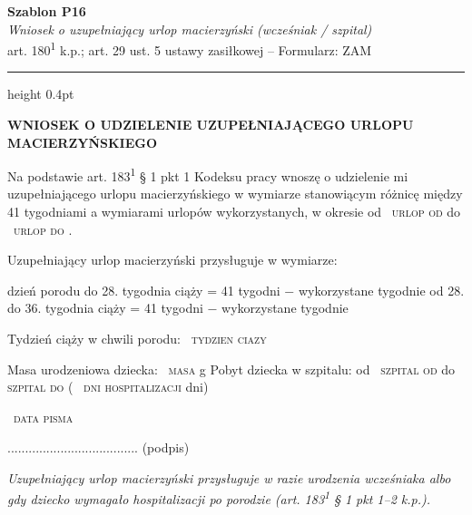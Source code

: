 \documentclass[11pt,a4paper]{article}
\newcommand{\Pole}[1]{%
  \textcolor{szary}{\dotfill}\,%
  {\scriptsize\textcolor{szary}{\textsc{#1}}}%
}
\newcommand{\NaglowekPisma}[1]{%
  \par\vspace{0.8em}%
  \begin{center}%
    {\large\bfseries\MakeUppercase{#1}}%
  \end{center}%
  \vspace{0.4em}%
}
\begin{document}
\begin{flushright}
{\footnotesize\color{szary}
\textbf{Szablon P16}\\
{\itshape Wniosek o uzupełniający urlop macierzyński (wcześniak / szpital)}\\
art. 180\textsuperscript{1} k.p.; art. 29 ust. 5 ustawy zasiłkowej -- Formularz: ZAM}\
\end{flushright}

\vspace{0.5em}
{\color{ramka}\hrule height 0.4pt}
\vspace{0.8em}

\NaglowekPisma{WNIOSEK O UDZIELENIE UZUPEŁNIAJĄCEGO URLOPU MACIERZYŃSKIEGO}

Na podstawie art. 183\textsuperscript{1} \S{} 1 pkt 1 Kodeksu pracy wnoszę o udzielenie mi
uzupełniającego urlopu macierzyńskiego w wymiarze stanowiącym różnicę
między 41 tygodniami a wymiarami urlopów wykorzystanych, w okresie
od \Pole{urlop od} do \Pole{urlop do}.

Uzupełniający urlop macierzyński przysługuje w wymiarze:

dzień porodu do 28. tygodnia ciąży        = 41 tygodni − wykorzystane tygodnie
od 28. do 36. tygodnia ciąży             = 41 tygodni − wykorzystane tygodnie

Tydzień ciąży w chwili porodu: \Pole{tydzien ciazy}
Masa urodzeniowa dziecka: \Pole{masa} g
Pobyt dziecka w szpitalu: od \Pole{szpital od} do \Pole{szpital do}  (\Pole{dni hospitalizacji} dni)

\Pole{data pisma}
.....................................
(podpis)

\vfill
{\footnotesize\textcolor{szary}\itshape Uzupełniający urlop macierzyński przysługuje w razie urodzenia wcześniaka albo gdy dziecko wymagało hospitalizacji po porodzie (art. 183\textsuperscript{1} \S{} 1 pkt 1--2 k.p.). }
\end{document}
